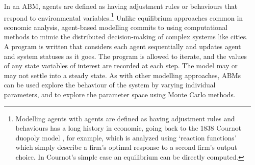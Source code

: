 




In an \gls{ABM}, agents are defined as having adjustment rules or behaviours that respond to environmental variables.\footnote{Modelling agents with agents are defined as having adjustment rules and behaviours has a long history in economic, going back to the 1838 Cournot duopoly model \cite{cournotRecherchesPrincipesMathematiques1838}, for example, which is analyzed using `reaction functions' which simply describe a firm's optimal response to a second firm's output choice. In Cournot's simple case an equilibrium can be directly computed.} 
Unlike equilibrium approaches common in economic analysis, agent-based modelling commits to using computational methods to mimic the distributed decision-making of complex systems like cities. A program is written that considers each agent sequentially and updates agent and system statuses as it goes. The program is allowed to iterate, and the values of any state variables of interest are recorded at each step. The model may or may not settle into a steady state. As with other modelling approaches, ABMs can be used explore the behaviour of the system by varying individual parameters, and to explore the parameter space using Monte Carlo methods.

